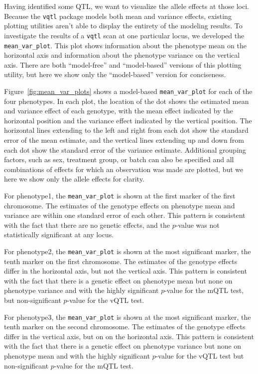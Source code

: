 \documentclass[9pt,twocolumn,twoside]{gsag3jnl}
\begin{document}
Having identified some QTL, we want to visualize the allele effects at those loci.
Because the \texttt{vqtl} package models both mean and variance effects, existing plotting utilities aren't able to display the entirety of the modeling results.
To investigate the results of a \texttt{vqtl} scan at one particular locus, we developed the \texttt{mean\_var\_plot}.
This plot shows information about the phenotype mean on the horizontal axis and information about the phenotype variance on the vertical axis.
There are both ``model-free'' and ``model-based'' versions of this plotting utility, but here we show only the ``model-based'' version for conciseness.

Figure~\ref{fig:mean_var_plots} shows a model-based \texttt{mean\_var\_plot} for each of the four phenotypes.
In each plot, the location of the dot shows the estimated mean and variance effect of each genotype, with the mean effect indicated by the horizontal position and the variance effect indicated by the vertical position.
The horizontal lines extending to the left and right from each dot show the standard error of the mean estimate, and the vertical lines extending up and down from each dot show the standard error of the variance estimate.
Additional grouping factors, such as sex, treatment group, or batch can also be specified and all combinations of effects for which an observation was made are plotted, but we here we show only the allele effects for clarity.

For phenotype1, the \texttt{mean\_var\_plot} is shown at the first marker of the first chromosome.
The estimates of the genotype effects on phenotype mean and variance are within one standard error of each other.
This pattern is consistent with the fact that there are no genetic effects, and the $p$-value was not statistically significant at any locus.

For phenotype2, the \texttt{mean\_var\_plot} is shown at the most significant marker, the tenth marker on the first chromosome.
The estimates of the genotype effects differ in the horizontal axis, but not the vertical axis.
This pattern is consistent with the fact that there is a genetic effect on phenotype mean but none on phenotype variance and with the highly significant $p$-value for the mQTL test, but non-significant $p$-value for the vQTL test.

For phenotype3, the \texttt{mean\_var\_plot} is shown at the most significant marker, the tenth marker on the second chromosome.
The estimates of the genotype effects differ in the vertical axis, but on on the horizontal axis.
This pattern is consistent with the fact that there is a genetic effect on phenotype variance but none on phenotype mean and with the highly significant $p$-value for the vQTL test but non-significant $p$-value for the mQTL test.
\end{document}
